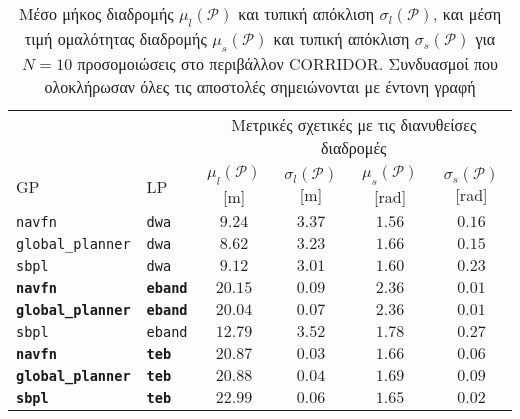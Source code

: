 \begin{table}[h]\centering
\renewcommand{\arraystretch}{1.3}
\begin{tabular}{llcccc}
  & & \multicolumn{4}{c}{Μετρικές σχετικές με τις διανυθείσες διαδρομές} \\
  \cline{3-6}
  GP & LP & $\mu_{l}(\bm{\mathcal{P}})$ [m] & $\sigma_{l}(\bm{\mathcal{P}})$ [m] & $\mu_{s}(\bm{\mathcal{P}})$ [rad] & $\sigma_{s}(\bm{\mathcal{P}})$ [rad] \\ \toprule
  \texttt{navfn} & \texttt{dwa} & $9.24$ & $3.37$ & $1.56$ & $0.16$ \\
  \texttt{global\_planner} & \texttt{dwa} & $8.62$ & $3.23$ & $1.66$ & $0.15$ \\
  \texttt{sbpl} & \texttt{dwa} & $9.12$ & $3.01$ & $1.60$ & $0.23$ \\
  \textbf{\texttt{navfn}} & \textbf{\texttt{eband}} & $\bm{20.15}$ & $\bm{0.09}$ & $\bm{2.36}$ & $\bm{0.01}$ \\
  \textbf{\texttt{global\_planner}} & \textbf{\texttt{eband}} & $\bm{20.04}$ & $\bm{0.07}$ & $\bm{2.36}$ & $\bm{0.01}$ \\
  \texttt{sbpl} & \texttt{eband} & $12.79$ & $3.52$ & $1.78$ & $0.27$ \\
  \textbf{\texttt{navfn}} & \textbf{\texttt{teb}} & $\bm{20.87}$ & $\bm{0.03}$ & $\bm{1.66}$ & $\bm{0.06}$ \\
  \textbf{\texttt{global\_planner}} & \textbf{\texttt{teb}} & $\bm{20.88}$ & $\bm{0.04}$ & $\bm{1.69}$ & $\bm{0.09}$ \\
  \textbf{\texttt{sbpl}} & \textbf{\texttt{teb}} & $\bm{22.99}$ & $\bm{0.06}$ & $\bm{1.65}$ & $\bm{0.02}$ \\ \bottomrule
\end{tabular}
\caption{\small Μέσο μήκος διαδρομής $\mu_{l}(\bm{\mathcal{P}})$ και τυπική
         απόκλιση $\sigma_{l}(\bm{\mathcal{P}})$, και μέση τιμή ομαλότητας
         διαδρομής $\mu_{s}(\bm{\mathcal{P}})$ και τυπική απόκλιση
         $\sigma_{s}(\bm{\mathcal{P}})$ για $N=10$ προσομοιώσεις στο περιβάλλον
         CORRIDOR. Συνδυασμοί που ολοκλήρωσαν όλες τις αποστολές  σημειώνονται
         με έντονη γραφή}
\label{tbl:info_ground_truth_corridor}
\end{table}

